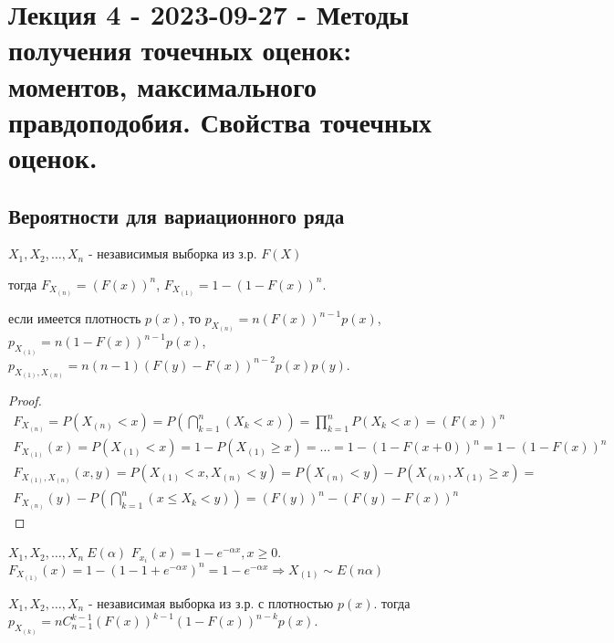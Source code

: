 \chapter{Лекция 4 - 2023-09-27 - Методы получения точечных оценок: моментов, максимального
правдоподобия. Свойства точечных оценок.}

\section{Вероятности для вариационного ряда}

\begin{theorem}
  $X_1, X_2, \dots, X_n$ - независимыя выборка из з.р. $F(X)$

  тогда $F_{X_{(n)}} = (F(x))^n$, $F_{X_{(1)}} = 1 - (1-F(x))^n$.

  если имеется плотность $p(x)$, то $p_{X_{(n)}} = n (F(x))^{n-1} p(x)$, $p_{X_{(1)}} = n (1-F(x))^{n-1} p(x)$, $p_{X_{(1)}, X_{(n)}} = n (n-1) (F(y) - F(x))^{n-2} p(x) p(y)$.
\end{theorem}

\begin{proof}
  \begin{multline}
    F_{X_{(n)}} = P(X_{(n)} < x) = P\left(\bigcap_{k=1}^n (X_k < x)\right) = \prod_{k=1}^n P(X_k < x) = (F(x))^n\\
    F_{X_{(1)}} (x) = P(X_{(1)} < x) = 1 - P(X_{(1)} \geqslant x) = \dots = 1 - (1-F(x+0))^n = 1 - (1-F(x))^n \\
    F_{X_{(1)}, X_{(n)}} (x, y) = P(X_{(1)} < x, X_{(n)} < y) = P(X_{(n)} < y) - P(X_{(n)}, X_{(1)} \geqslant x) = \\
    F_{X_{(n)}} (y) - P(\bigcap_{k=1}^n (x \leqslant X_k < y)) = (F(y))^n - (F(y) - F(x))^n
  \end{multline}
\end{proof}

\begin{ex}
  $X_1, X_2, \dots, X_n ~ E(\alpha)$
  $F_{x_i} (x) = 1- e^{-\alpha x}, x\geqslant 0.$
  $F_{X_{(1)}} (x) = 1 - (1-1+e^{-\alpha x})^n = 1 - e^{-\alpha x} \Rightarrow X_{(1)} \sim E(n\alpha)$
\end{ex}

\begin{theorem}
  $X_1, X_2, \dots, X_n$ - независимая выборка из з.р. с плотностью $p(x)$.
  тогда $p_{X_{(k)}} = n C_{n-1}^{k-1} (F(x))^{k-1} (1-F(x))^{n-k} p(x)$.
\end{theorem}

